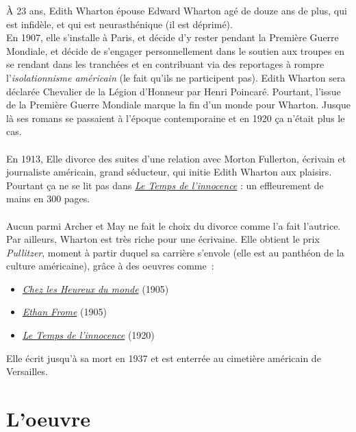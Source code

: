 \documentclass[a4paper,12pt]{article}
\newcommand{\lti}{\underline{\textit{Le Temps de l'innocence}} }
\begin{document}
À 23 ans, Edith Wharton épouse Edward Wharton agé de douze ans de plus, qui est infidèle, et qui est neurasthénique (il est déprimé).\\
En 1907, elle s'installe à Paris, et décide d'y rester pendant la Première Guerre Mondiale, et décide de s'engager personnellement dans le soutien aux troupes en se rendant dans les tranchées et en contribuant via des reportages à rompre l'\textit{isolationnisme américain} (le fait qu'ils ne participent pas). Edith Wharton sera déclarée Chevalier de la Légion d'Honneur par Henri Poincaré. Pourtant, l'issue de la Première Guerre Mondiale marque la fin d'un monde pour Wharton. Jusque là ses romans se passaient à l'époque contemporaine et en 1920 ça n'était plus le cas.\\\\

En 1913, Elle divorce des suites d'une relation avec Morton Fullerton, écrivain et journaliste américain, grand séducteur, qui initie Edith Wharton aux plaisirs. Pourtant ça ne se lit pas dans \lti : un effleurement de mains en 300 pages.\\\\

Aucun parmi Archer et May ne fait le choix du divorce comme l'a fait l'autrice.\\
Par ailleurs, Wharton est très riche pour une écrivaine. Elle obtient le prix \textit{Pullitzer}, moment à partir duquel sa carrière s'envole (elle est au panthéon de la culture américaine), grâce à des oeuvres comme~:
\begin{itemize}
    \item \underline{\textit{Chez les Heureux du monde}} (1905)
    \item \underline{\textit{Ethan Frome}} (1905)
    \item \lti (1920)
\end{itemize}

Elle écrit jusqu'à sa mort en 1937 et est enterrée au cimetière américain de Versailles.

\section{L'oeuvre}
\end{document}
